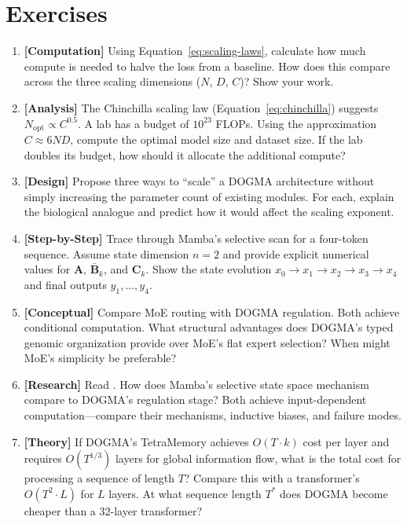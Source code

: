 \section{Exercises}
\label{sec:ch15-exercises}

\begin{enumerate}[label=\textbf{15.\arabic*.}, leftmargin=2.5em]
\item \textbf{[Computation]} Using Equation~\ref{eq:scaling-laws}, calculate how much compute is needed to halve the loss from a baseline. How does this compare across the three scaling dimensions ($N$, $D$, $C$)? Show your work.

\item \textbf{[Analysis]} The Chinchilla scaling law (Equation~\ref{eq:chinchilla}) suggests $N_{\text{opt}} \propto C^{0.5}$. A lab has a budget of $10^{23}$ FLOPs. Using the approximation $C \approx 6ND$, compute the optimal model size and dataset size. If the lab doubles its budget, how should it allocate the additional compute?

\item \textbf{[Design]} Propose three ways to ``scale'' a DOGMA architecture without simply increasing the parameter count of existing modules. For each, explain the biological analogue and predict how it would affect the scaling exponent.

\item \textbf{[Step-by-Step]} Trace through Mamba's selective scan for a four-token sequence. Assume state dimension $n=2$ and provide explicit numerical values for $\mathbf{A}$, $\bar{\mathbf{B}}_k$, and $\mathbf{C}_k$. Show the state evolution $x_0 \to x_1 \to x_2 \to x_3 \to x_4$ and final outputs $y_1, \ldots, y_4$.

\item \textbf{[Conceptual]} Compare MoE routing with DOGMA regulation. Both achieve conditional computation. What structural advantages does DOGMA's typed genomic organization provide over MoE's flat expert selection? When might MoE's simplicity be preferable?

\item \textbf{[Research]} Read \citet{gu2023mamba}. How does Mamba's selective state space mechanism compare to DOGMA's regulation stage? Both achieve input-dependent computation---compare their mechanisms, inductive biases, and failure modes.

\item \textbf{[Theory]} If DOGMA's TetraMemory achieves $O(T \cdot k)$ cost per layer and requires $O(T^{1/3})$ layers for global information flow, what is the total cost for processing a sequence of length $T$? Compare this with a transformer's $O(T^2 \cdot L)$ for $L$ layers. At what sequence length $T^*$ does DOGMA become cheaper than a 32-layer transformer?


\end{enumerate}
